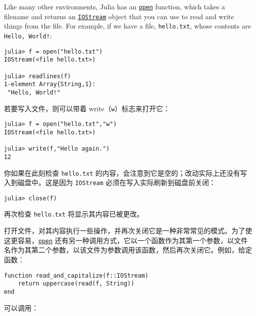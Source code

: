 Like many other environments, Julia has an \hyperlink{300818094931158296}{\texttt{open}} function, which takes a filename and returns an \hyperlink{12496894737220238417}{\texttt{IOStream}} object that you can use to read and write things from the file. For example, if we have a file, \texttt{hello.txt}, whose contents are \texttt{Hello, World!}:




\begin{verbatim}
julia> f = open("hello.txt")
IOStream(<file hello.txt>)

julia> readlines(f)
1-element Array{String,1}:
 "Hello, World!"
\end{verbatim}



若要写入文件，则可以带着 write（\texttt{{\textquotedbl}w{\textquotedbl}}）标志来打开它：




\begin{verbatim}
julia> f = open("hello.txt","w")
IOStream(<file hello.txt>)

julia> write(f,"Hello again.")
12
\end{verbatim}



你如果在此刻检查 \texttt{hello.txt} 的内容，会注意到它是空的；改动实际上还没有写入到磁盘中。这是因为 \texttt{IOStream} 必须在写入实际刷新到磁盘前关闭：




\begin{verbatim}
julia> close(f)
\end{verbatim}



再次检查 \texttt{hello.txt} 将显示其内容已被更改。



打开文件，对其内容执行一些操作，并再次关闭它是一种非常常见的模式。为了使这更容易，\hyperlink{300818094931158296}{\texttt{open}} 还有另一种调用方式，它以一个函数作为其第一个参数，以文件名作为其第二个参数，以该文件为参数调用该函数，然后再次关闭它。例如，给定函数：




\begin{verbatim}
function read_and_capitalize(f::IOStream)
    return uppercase(read(f, String))
end
\end{verbatim}



可以调用：





